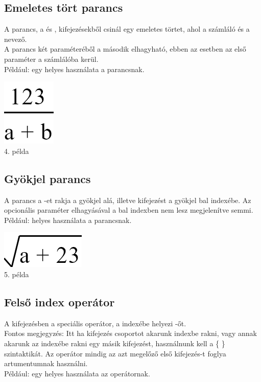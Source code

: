 \documentclass[../spec.tex]{subfiles}
\begin{document}
    \subsection{Emeletes tört parancs}\label{subsec:emelett-parancs}
    A  parancs, a  és , kifejezésekből csinál egy emeletes törtet, ahol  a számláló és  a nevező.\\
    A parancs két paraméteréből a második elhagyható, ebben az esetben az első paraméter a számlálóba kerül.\\
    Például:  egy helyes használata a parancsnak.

    \begin{center}
        \includegraphics[scale=0.4]{./images/doc4.png}\\
        4. példa
    \end{center}

    \subsection{Gyökjel parancs}\label{subsec:gyökjel-parancs}
    A  parancs a -et rakja a gyökjel alá, illetve  kifejezést a gyökjel bal indexébe.
    Az opcionális paraméter elhagyásával a bal indexben nem lesz megjelenítve semmi.\\
    Például:  helyes használata a parancsnak.

    \begin{center}
        \includegraphics[scale=0.4]{./images/doc5.png}\\
        5. példa
    \end{center}

    \subsection{Felső index operátor}\label{subsec:index-cmd}
    A \lang{[kif1]\tc [kif2]} kifejezésben a speciális \lang{\tc} operátor, a \lang{[kif1]} indexébe helyezi -őt.\\
    Fontos megjegyzés: Itt ha kifejezés csoportot akarunk indexbe rakni, vagy annak akarunk az indexébe rakni egy másik kifejezést, használnunk kell a \{ \} szintaktikát.
    Az operátor mindig az azt megelőző első kifejezés-t foglya artumentumnak használni.\\
    Például:  egy helyes használata az operátornak.
\end{document}
